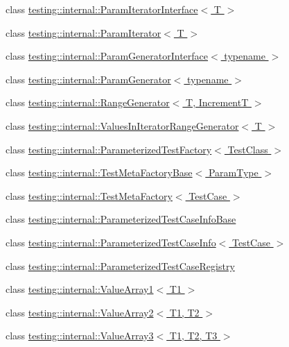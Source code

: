 \begin{DoxyCompactItemize}
class \hyperlink{classtesting_1_1internal_1_1_param_iterator_interface}{testing\-::internal\-::\-Param\-Iterator\-Interface$<$ T $>$}
\item 
class \hyperlink{classtesting_1_1internal_1_1_param_iterator}{testing\-::internal\-::\-Param\-Iterator$<$ T $>$}
\item 
class \hyperlink{classtesting_1_1internal_1_1_param_generator_interface}{testing\-::internal\-::\-Param\-Generator\-Interface$<$ typename $>$}
\item 
class \hyperlink{classtesting_1_1internal_1_1_param_generator}{testing\-::internal\-::\-Param\-Generator$<$ typename $>$}
\item 
class \hyperlink{classtesting_1_1internal_1_1_range_generator}{testing\-::internal\-::\-Range\-Generator$<$ T, Increment\-T $>$}
\item 
class \hyperlink{classtesting_1_1internal_1_1_values_in_iterator_range_generator}{testing\-::internal\-::\-Values\-In\-Iterator\-Range\-Generator$<$ T $>$}
\item 
class \hyperlink{classtesting_1_1internal_1_1_parameterized_test_factory}{testing\-::internal\-::\-Parameterized\-Test\-Factory$<$ Test\-Class $>$}
\item 
class \hyperlink{classtesting_1_1internal_1_1_test_meta_factory_base}{testing\-::internal\-::\-Test\-Meta\-Factory\-Base$<$ Param\-Type $>$}
\item 
class \hyperlink{classtesting_1_1internal_1_1_test_meta_factory}{testing\-::internal\-::\-Test\-Meta\-Factory$<$ Test\-Case $>$}
\item 
class \hyperlink{classtesting_1_1internal_1_1_parameterized_test_case_info_base}{testing\-::internal\-::\-Parameterized\-Test\-Case\-Info\-Base}
\item 
class \hyperlink{classtesting_1_1internal_1_1_parameterized_test_case_info}{testing\-::internal\-::\-Parameterized\-Test\-Case\-Info$<$ Test\-Case $>$}
\item 
class \hyperlink{classtesting_1_1internal_1_1_parameterized_test_case_registry}{testing\-::internal\-::\-Parameterized\-Test\-Case\-Registry}
\item 
class \hyperlink{classtesting_1_1internal_1_1_value_array1}{testing\-::internal\-::\-Value\-Array1$<$ T1 $>$}
\item 
class \hyperlink{classtesting_1_1internal_1_1_value_array2}{testing\-::internal\-::\-Value\-Array2$<$ T1, T2 $>$}
\item 
class \hyperlink{classtesting_1_1internal_1_1_value_array3}{testing\-::internal\-::\-Value\-Array3$<$ T1, T2, T3 $>$}

\end{DoxyCompactItemize}
